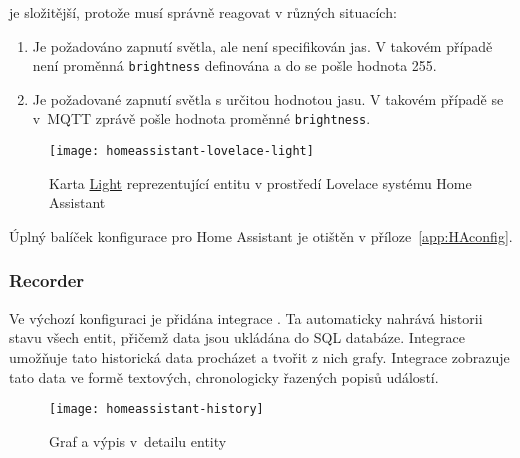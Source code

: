  je složitější, protože musí správně reagovat
v různých situacích:
\begin{enumerate}[nosep]
    \item Je požadováno zapnutí světla, ale není specifikován jas. V takovém
        případě není proměnná \texttt{brightness} definována a do
         se pošle hodnota \num{255}.
    \item Je požadované zapnutí světla s určitou hodnotou jasu. V takovém
        případě se v~MQTT zprávě pošle hodnota proměnné \texttt{brightness}.
\end{enumerate}

\begin{figure}[htb]
    \centering
    \texttt{[image: homeassistant-lovelace-light]}
    \caption{%
        Karta \href{https://www.home-assistant.io/lovelace/light/}{Light}
        reprezentující entitu  v prostředí
        Lovelace systému Home Assistant
    }
    \label{fig:homeassistant lovelace light}
\end{figure}

Úplný balíček konfigurace pro Home Assistant je otištěn
v příloze~\vref{app:HAconfig}.


\subsubsection{Recorder}
Ve výchozí konfiguraci je přidána integrace . Ta
automaticky nahrává historii stavu všech entit, přičemž data jsou ukládána do
SQL databáze. Integrace  umožňuje tato historická data
procházet a tvořit z nich grafy. Integrace  zobrazuje
tato data ve formě textových, chronologicky řazených popisů událostí.

\begin{figure}[htb]
    \centering
    \texttt{[image: homeassistant-history]}
    \caption{%
        Graf  a výpis  v~detailu
        entity 
    }
    \label{fig:homeassistant lovelace light history}
\end{figure}

